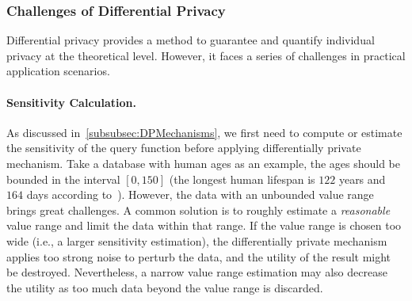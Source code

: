 



\subsubsection{Challenges of Differential Privacy}
\label{subsubsec:challengesOfDP}
Differential privacy provides a method to guarantee and quantify individual privacy at the theoretical level. However, it faces a series of challenges in practical application scenarios.

\paragraph{Sensitivity Calculation.}
As discussed in~\autoref{subsubsec:DPMechanisms}, we first need to compute or estimate the sensitivity of the query function before applying differentially private mechanism. Take a database with human ages as an example, the ages should be bounded in the interval $\left[0,150\right] $ (the longest human lifespan is $122$ years and $164$ days according to~\cite{whitney_1997}). However, the data with an unbounded value range brings great challenges. A common solution is to roughly estimate a \textit{reasonable} value range and limit the data within that range. If the value range is chosen too wide (i.e., a larger sensitivity estimation), the differentially private mechanism applies too strong noise to perturb the data, and the utility of the result might be destroyed. Nevertheless, a narrow value range estimation may also decrease the utility as too much data beyond the value range is discarded.

